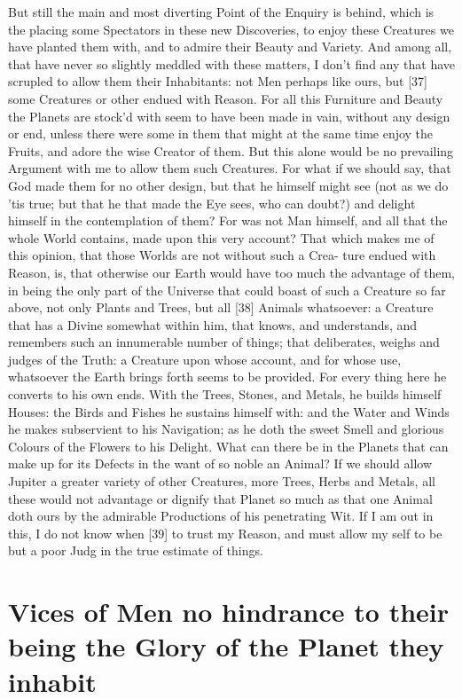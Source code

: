 \documentclass[letterpaper]{book}
\begin{document}
But still the main and most diverting Point of the Enquiry is behind, which
is the placing some Spectators in these new Discoveries, to enjoy these
Creatures we have planted them with, and to admire their Beauty and
Variety.  And among all, that have never so slightly meddled with these
matters, I don't find any that have scrupled to allow them their
Inhabitants: not Men perhaps like ours, but [37] some Creatures or other
endued with Reason.  For all this Furniture and Beauty the Planets are
stock'd with seem to have been made in vain, without any design or end,
unless there were some in them that might at the same time enjoy the Fruits,
and adore the wise Creator of them. But this alone would be no prevailing
Argument with me to allow them such Creatures. For what if we should say,
that God made them for no other design, but that he himself might see (not
as we do 'tis true; but that he that made the Eye sees, who can doubt?) and
delight himself in the contemplation of them? For was not Man himself, and
all that the whole World contains, made upon this very account? That which
makes me of this opinion, that those Worlds are not without such a Crea-
ture endued with Reason, is, that otherwise our Earth would have too much
the advantage of them, in being the only part of the Universe that could
boast of such a Creature so far above, not only Plants and Trees, but all
[38] Animals whatsoever: a Creature that has a Divine somewhat within him,
that knows, and understands, and remembers such an innumerable number of
things; that deliberates, weighs and judges of the Truth: a Creature upon
whose account, and for whose use, whatsoever the Earth brings forth seems to
be provided. For every thing here he converts to his own ends. With the
Trees, Stones, and Metals, he builds himself Houses: the Birds and Fishes he
sustains himself with: and the Water and Winds he makes subservient to his
Navigation; as he doth the sweet Smell and glorious Colours of the Flowers
to his Delight. What can there be in the Planets that can make up for its
Defects in the want of so noble an Animal? If we should allow Jupiter a
greater variety of other Creatures, more Trees, Herbs and Metals, all these
would not advantage or dignify that Planet so much as that one Animal doth
ours by the admirable Productions of his penetrating Wit. If I am out in
this, I do not know when [39] to trust my Reason, and must allow my self to
be but a poor Judg in the true estimate of things.


\section{Vices of Men no hindrance to their being the Glory of the Planet
they inhabit}
\end{document}
